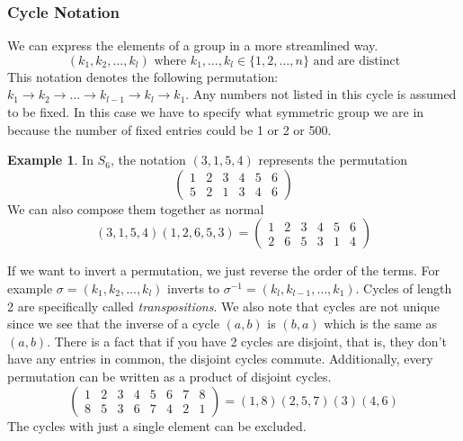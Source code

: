 \documentclass{article}
\theoremstyle{definition}
\newtheorem{example}[theorem]{Example}
\begin{document}
\subsubsection{Cycle Notation}
We can express the elements of a group in a more streamlined way.
\begin{equation*}
    (k_1,k_2,\ldots,k_l) \text{ where } k_1,\ldots,k_l \in \{1,2,\ldots,n\} \text{ and are distinct}
\end{equation*}
This notation denotes the following permutation: $k_1\rightarrow k_2\rightarrow\ldots\rightarrow k_{l-1}\rightarrow k_l\rightarrow k_1$. Any numbers not listed in this cycle is assumed to be fixed. In this case we have to specify what symmetric group we are in because the number of fixed entries could be 1 or 2 or 500.
\begin{example}
    In $S_6$, the notation $(3,1,5,4)$ represents the permutation
    \begin{equation*}
        \begin{pmatrix}
            1&2&3&4&5&6\\5&2&1&3&4&6
        \end{pmatrix}
    \end{equation*}
    We can also compose them together as normal 
    \begin{equation*}
        (3,1,5,4)(1,2,6,5,3) =\begin{pmatrix}
            1&2&3&4&5&6\\2&6&5&3&1&4
        \end{pmatrix}
    \end{equation*}
\end{example}
If we want to invert a permutation, we just reverse the order of the terms. For example $\sigma=(k_1,k_2,\ldots,k_l)$ inverts to $\sigma^{-1}=(k_l,k_{l-1},\ldots,k_1)$. Cycles of length 2 are specifically called \emph{transpositions}. We also note that cycles are not unique since we see that the inverse of a cycle $(a,b)$ is $(b,a)$ which is the same as $(a,b)$. There is a fact that if you have 2 cycles are disjoint, that is, they don't have any entries in common, the disjoint cycles commute. Additionally, every permutation can be written as a product of disjoint cycles. 
\begin{equation*}
    \begin{pmatrix}
        1&2&3&4&5&6&7&8\\8&5&3&6&7&4&2&1
    \end{pmatrix} = (1,8)(2,5,7)(3)(4,6)
\end{equation*}
The cycles with just a single element can be excluded.
\end{document}
